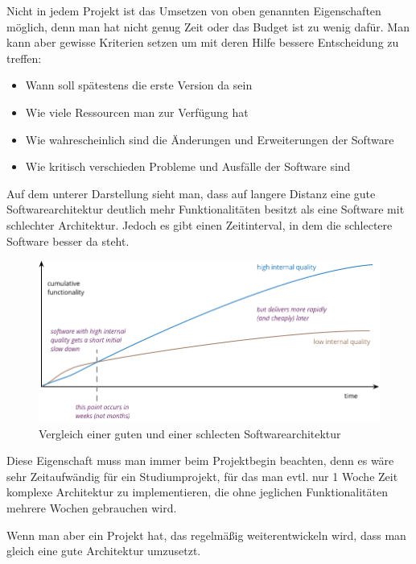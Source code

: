 \documentclass{article}
\begin{document}
    Nicht in jedem Projekt ist das Umsetzen von oben genannten Eigenschaften möglich, denn man hat nicht genug Zeit oder das Budget ist zu wenig dafür.
    Man kann aber gewisse Kriterien setzen um mit deren Hilfe bessere Entscheidung zu treffen:
    \begin{itemize}
        \item Wann soll spätestens die erste Version da sein
        \item Wie viele Ressourcen man zur Verfügung hat
        \item Wie wahrescheinlich sind die Änderungen und Erweiterungen der Software
        \item Wie kritisch verschieden Probleme und Ausfälle der Software sind 
    \end{itemize}

    Auf dem unterer Darstellung sieht man, dass auf langere Distanz eine gute Softwarearchitektur deutlich
    mehr Funktionalitäten besitzt als eine Software mit schlechter Architektur. 
    Jedoch es gibt einen Zeitinterval, in dem die schlectere Software besser da steht.
    \begin{figure}[H]
        \centering
        \includegraphics[width=1\textwidth]{./images/QASoftwareCompare.png}
        \caption{Vergleich einer guten und einer schlecten Softwarearchitektur}
        \label{fig:flow around cylinder}
    \end{figure}

    Diese Eigenschaft muss man immer beim Projektbegin beachten, denn es wäre sehr Zeitaufwändig für ein Studiumprojekt, 
    für das man evtl. nur 1 Woche Zeit komplexe Architektur zu implementieren, die ohne jeglichen Funktionalitäten mehrere Wochen gebrauchen wird.

    Wenn man aber ein Projekt hat, das regelmäßig weiterentwickeln wird, dass man gleich eine gute Architektur umzusetzt.
\end{document}
